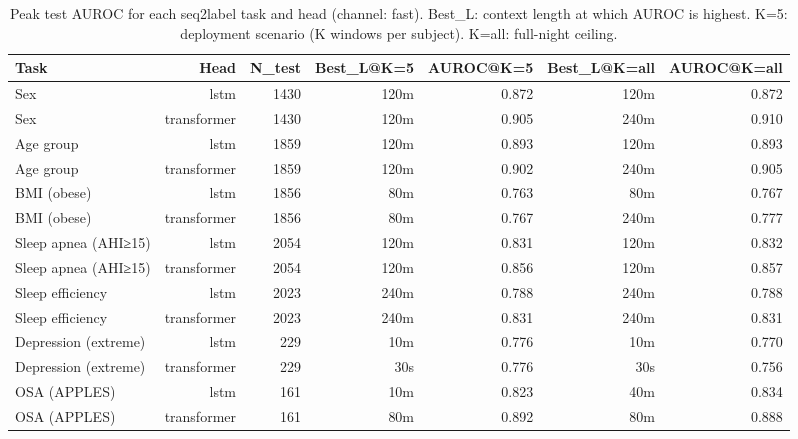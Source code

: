 \begin{table}[ht]
\centering
\caption{Peak test AUROC for each seq2label task and head (channel: fast). Best\_L: context length at which AUROC is highest. K=5: deployment scenario (K windows per subject). K=all: full-night ceiling.}
\label{tab:peak_auroc_fast}
\begin{tabular}{lrrrrrr}
\toprule
Task & Head & N_test & Best_L@K=5 & AUROC@K=5 & Best_L@K=all & AUROC@K=all \\
\midrule
Sex & lstm & 1430 & 120m & 0.872 & 120m & 0.872 \\
Sex & transformer & 1430 & 120m & 0.905 & 240m & 0.910 \\
Age group & lstm & 1859 & 120m & 0.893 & 120m & 0.893 \\
Age group & transformer & 1859 & 120m & 0.902 & 240m & 0.905 \\
BMI (obese) & lstm & 1856 & 80m & 0.763 & 80m & 0.767 \\
BMI (obese) & transformer & 1856 & 80m & 0.767 & 240m & 0.777 \\
Sleep apnea (AHI≥15) & lstm & 2054 & 120m & 0.831 & 120m & 0.832 \\
Sleep apnea (AHI≥15) & transformer & 2054 & 120m & 0.856 & 120m & 0.857 \\
Sleep efficiency & lstm & 2023 & 240m & 0.788 & 240m & 0.788 \\
Sleep efficiency & transformer & 2023 & 240m & 0.831 & 240m & 0.831 \\
Depression (extreme) & lstm & 229 & 10m & 0.776 & 10m & 0.770 \\
Depression (extreme) & transformer & 229 & 30s & 0.776 & 30s & 0.756 \\
OSA (APPLES) & lstm & 161 & 10m & 0.823 & 40m & 0.834 \\
OSA (APPLES) & transformer & 161 & 80m & 0.892 & 80m & 0.888 \\
\bottomrule
\end{tabular}
\end{table}